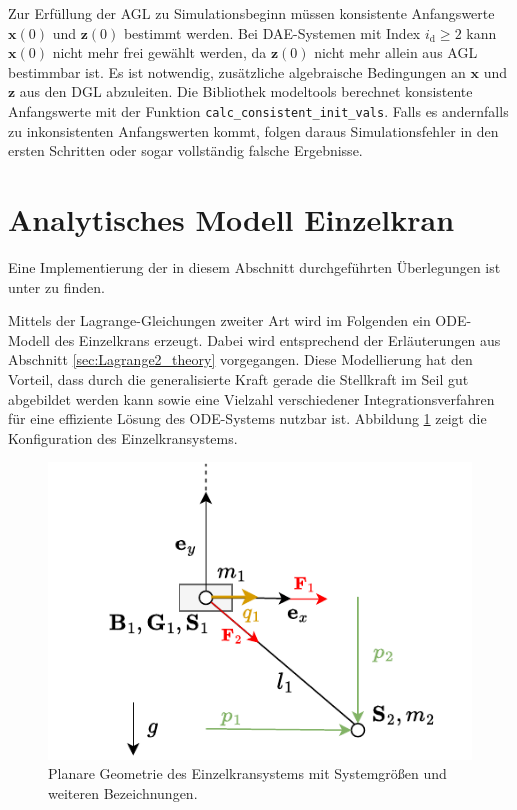 Zur Erfüllung der AGL zu Simulationsbeginn müssen konsistente Anfangswerte $\mathbf{x}(0)$ und $\mathbf{z}(0)$ bestimmt werden. Bei DAE-Systemen mit Index $i_\mathrm{d} \geq 2$  kann $\mathbf{x}(0)$ nicht mehr frei gewählt werden, da $\mathbf{z}(0)$ nicht mehr allein aus AGL bestimmbar ist. Es ist notwendig, zusätzliche algebraische Bedingungen an $\mathbf{x}$ und $\mathbf{z}$ aus den DGL abzuleiten. Die Bibliothek modeltools berechnet konsistente Anfangswerte mit der Funktion \texttt{calc\_consistent\_init\_vals}. Falls es andernfalls zu inkonsistenten Anfangswerten kommt, folgen daraus Simulationsfehler in den ersten Schritten oder sogar vollständig falsche Ergebnisse. \cite[S.207]{JanschekSystementwurf}

\section{Analytisches Modell Einzelkran}
Eine Implementierung der in diesem Abschnitt durchgeführten Überlegungen ist unter \cite[flatness\_notebooks/ODE\_flatness\_analysis\_single\_crane.ipynb]{SAGithub} zu finden.

Mittels der Lagrange-Gleichungen zweiter Art wird im Folgenden ein ODE-Modell des Einzelkrans erzeugt. Dabei wird entsprechend der Erläuterungen aus Abschnitt \ref{sec:Lagrange2_theory} vorgegangen. Diese Modellierung hat den Vorteil, dass durch die generalisierte Kraft gerade die Stellkraft im Seil gut abgebildet werden kann sowie eine Vielzahl verschiedener Integrationsverfahren für eine effiziente Lösung des ODE-Systems nutzbar ist. Abbildung \ref{fig:single_crane_diagram} zeigt die Konfiguration des Einzelkransystems.

\begin{figure}[ht]
	\begin{center}
		\includegraphics[scale=1]{Pictures/ODE_flatness_analysis_single_crane_diagram}
	\end{center}
	\caption[Planare Geometrie des Einzelkransystems]
	{Planare Geometrie des Einzelkransystems mit Systemgrößen und weiteren Bezeichnungen.}
	\label{fig:single_crane_diagram}
\end{figure}

